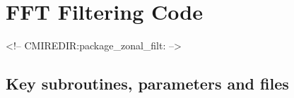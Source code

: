\section{FFT Filtering Code}
\label{sec:zonal_filt}
\begin{rawhtml}
<!-- CMIREDIR:package_zonal_filt: -->
\end{rawhtml}

\subsection{Key subroutines, parameters and files}
\label{sec:pkg:zonal_filt:implementation_synopsis}
